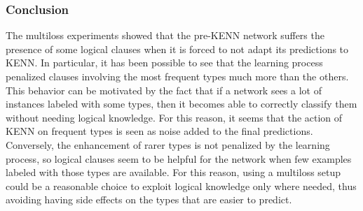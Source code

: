 \subsubsection{Conclusion}
The multiloss experiments showed that the pre-KENN network suffers the presence of some logical clauses when it is forced to not adapt its predictions to KENN. In particular, it has been possible to see that the learning process penalized clauses involving the most frequent types much more than the others. This behavior can be motivated by the fact that if a network sees a lot of instances labeled with some types, then it becomes able to correctly classify them without needing logical knowledge. For this reason, it seems that the action of KENN on frequent types is seen as noise added to the final predictions. Conversely, the enhancement of rarer types is not penalized by the learning process, so logical clauses seem to be helpful for the network when few examples labeled with those types are available. For this reason, using a multiloss setup could be a reasonable choice to exploit logical knowledge only where needed, thus avoiding having side effects on the types that are easier to predict.

